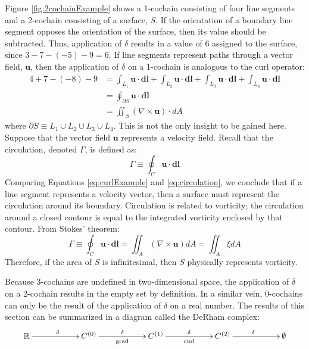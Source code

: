 Figure \ref{fig:2cochainExample} shows a 1-cochain consisting of four line segments and a 2-cochain consisting of a surface, $S$. If the orientation of a boundary line segment opposes the orientation of the surface, then its value should be subtracted. Thus, application of $\delta$ results in a value of $6$ assigned to the surface, since $3 - 7 - (-5) - 9 = 6$. If line segments represent paths through a vector field, $\mathbf{u}$, then the application of $\delta$ on a 1-cochain is analogous to the curl operator:
\begin{equation}
    \begin{split}
        4 + 7 - (-8) - 9 &= \int_{L_1} \mathbf{u} \cdot \mathbf{dl} + \int_{L_2} \mathbf{u} \cdot \mathbf{dl} + \int_{L_3} \mathbf{u} \cdot \mathbf{dl} + \int_{L_4} \mathbf{u} \cdot \mathbf{dl} \\
        &= \oint_{\partial S} \mathbf{u} \cdot \mathbf{dl} \\
        &= \iint_{S} \left( \nabla \times \mathbf{u} \right) \cdot dA
    \end{split}
    \label{eq:curlExample}
\end{equation}
where $\partial S \equiv L_1 \cup L_2 \cup L_3 \cup L_4$. This is not the only insight to be gained here. Suppose that the vector field $\mathbf{u}$ represents a velocity field. Recall that the circulation, denoted $\Gamma$, is defined as:
\begin{equation}
    \Gamma \equiv \oint_C \mathbf{u} \cdot \mathbf{dl}
    \label{eq:circulation}
\end{equation}
Comparing Equations \eqref{eq:curlExample} and \eqref{eq:circulation}, we conclude that if a line segment represents a velocity vector, then a surface must represent the circulation around its boundary. Circulation is related to vorticity; the circulation around a closed contour is equal to the integrated vorticity enclosed by that contour. From Stokes' theorem:
\begin{equation}
    \Gamma \equiv \oint_C \mathbf{u} \cdot \mathbf{dl} = \iint_A \left( \nabla \times \mathbf{u} \right) dA = \iint_A \xi dA
\end{equation}
Therefore, if the area of $S$ is infinitesimal, then $S$ physically represents vorticity.

Because $3$-cochains are undefined in two-dimensional space, the application of $\delta$ on a 2-cochain results in the empty set by definition. In a similar vein, 0-cochains can only be the result of the application of $\delta$ on a real number. The results of this section can be summarized in a diagram called the DeRham complex:
\begin{equation}
    \begin{gathered}
        \xymatrix@C=13ex{
            \mathbb{R} \ar[r]^{\delta} & C^{(0)} \ar[r]^{\delta}_{\text{grad}} & C^{(1)} \ar[r]^{\delta}_{\text{curl}} & C^{(2)} \ar[r]^{\delta} & \emptyset
        }
    \end{gathered}
\end{equation}

